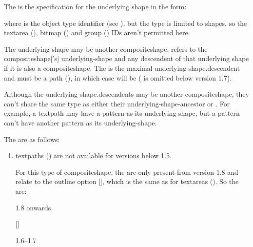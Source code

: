 \begin{numbered}
The  is the specification for the
underlying shape in the form:
\begin{syntaxline}
 
\end{syntaxline}
where  is the object type identifier (see
), but the type is limited to shapes, so the 
\gls*{textarea} (\hyperref[jdr:textarea]{}), 
\gls*{bitmap} (\hyperref[jdr:bitmap]{}) and
\gls*{group} (\hyperref[jdr:group]{}) IDs aren't permitted here.

The \gls{underlying-shape} may be another \gls{compositeshape}.
\emph{} 
refers to the \gls{compositeshape}['s]
\gls{underlying-shape} and any descendent of that underlying shape if it
is also a \gls*{compositeshape}. The
\emph{} is the
maximal \gls{underlying-shape.descendent} and must be a 
\gls*{path} (\hyperref[jdr:path]{}),
in which case   will be
   
( is omitted below version 1.7).

Although the \glspl{underlying-shape.descendent} may be another
\gls*{compositeshape}, they can't share the same type as either
their \gls{underlying-shape-ancestor} or
. For example, a
\gls{textpath} may have a \gls{pattern} as its \gls{underlying-shape}, but
a pattern can't have another pattern as its \gls{underlying-shape}.

The  are as follows:

  \begin{enumerate}%
  \item\label{jdr:textpath}%
  \Glspl{textpath} () are not available for versions below 1.5.

  For this type of \gls{compositeshape}, the  are only
  present from version 1.8 and relate to the outline option
   [], which is
  the same as for \glspl*{textarea} (\hyperref[jdr:textarea]{}). So the
   are:
  \begin{jdrversion}{1.8 onwards}
  \begin{syntaxline}
   [] 
  \end{syntaxline}
  \end{jdrversion}
  \begin{jdrversion}{1.6--1.7}
  \begin{syntaxline}
  \end{syntaxline}
  \end{jdrversion}


\end{enumerate}
\end{numbered}
